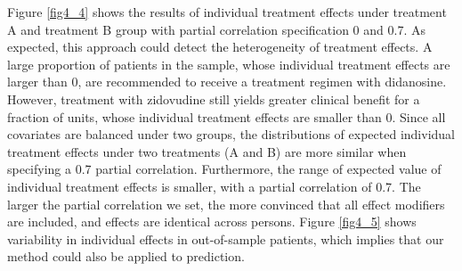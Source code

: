 	Figure \ref{fig4_4} shows the results of individual treatment effects under treatment A and treatment B group with partial correlation specification 0 and 0.7. As expected, this approach could detect the heterogeneity of treatment effects. A large proportion of patients in the sample, whose individual treatment effects are larger than 0, are recommended to receive a treatment regimen with didanosine. However, treatment with zidovudine still yields greater clinical benefit for a fraction of units, whose individual treatment effects are smaller than 0. Since all covariates are balanced under two groups, the distributions of expected individual treatment effects under two treatments (A and B) are more similar when specifying a 0.7 partial correlation. Furthermore, the range of expected value of individual treatment effects is smaller, with a partial correlation of 0.7. The larger the partial correlation we set, the more convinced that all effect modifiers are included, and effects are identical across persons. Figure \ref{fig4_5} shows variability in individual effects in out-of-sample patients, which implies that our method could also be applied to prediction. 
